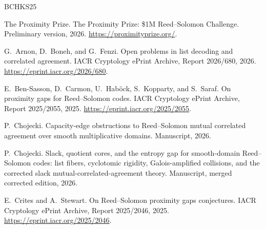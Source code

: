 \documentclass[11pt]{article}
\theoremstyle{definition}
\theoremstyle{remark}
\begin{document}
\begin{thebibliography}{BCHKS25}

The Proximity Prize.
\newblock The Proximity Prize: \$1M Reed--Solomon Challenge.
\newblock Preliminary version, 2026.
\newblock \url{https://proximityprize.org/}.


G.~Arnon, D.~Boneh, and G.~Fenzi.
\newblock Open problems in list decoding and correlated agreement.
\newblock IACR Cryptology ePrint Archive, Report 2026/680, 2026.
\newblock \url{https://eprint.iacr.org/2026/680}.

E.~Ben-Sasson, D.~Carmon, U.~Hab{\"o}ck, S.~Kopparty, and S.~Saraf.
\newblock On proximity gaps for Reed--Solomon codes.
\newblock IACR Cryptology ePrint Archive, Report 2025/2055, 2025.
\newblock \url{https://eprint.iacr.org/2025/2055}.

P.~Chojecki.
\newblock Capacity-edge obstructions to Reed--Solomon mutual correlated agreement over smooth multiplicative domains.
\newblock Manuscript, 2026.

P.~Chojecki.
\newblock Slack, quotient cores, and the entropy gap for smooth-domain Reed--Solomon codes: list fibers, cyclotomic rigidity, Galois-amplified collisions, and the corrected slack mutual-correlated-agreement theory.
\newblock Manuscript, merged corrected edition, 2026.

E.~Crites and A.~Stewart.
\newblock On Reed--Solomon proximity gaps conjectures.
\newblock IACR Cryptology ePrint Archive, Report 2025/2046, 2025.
\newblock \url{https://eprint.iacr.org/2025/2046}.

\end{thebibliography}
\end{document}
